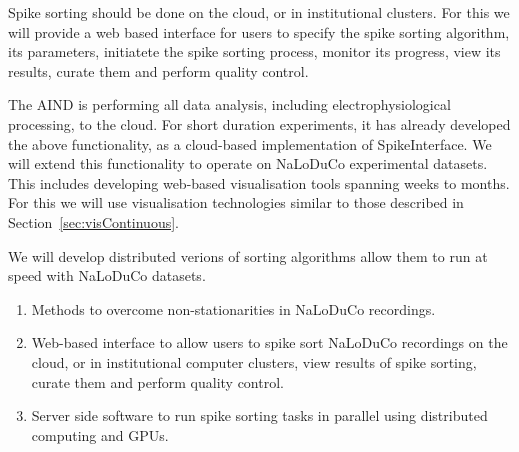 
Spike sorting should be done on the cloud, or in institutional clusters. For
this we will provide a web based interface for users to specify the spike
sorting algorithm, its parameters, initiatete the spike sorting process,
monitor its progress, view its results, curate them and perform quality
control.

The AIND is performing all data analysis, including electrophysiological
processing, to the cloud. For short duration experiments, it has already
developed the above functionality, as a cloud-based implementation of
SpikeInterface.
%
We will extend this functionality to operate on NaLoDuCo experimental datasets.
This includes developing web-based visualisation tools
spanning weeks to months. For this we will use visualisation technologies similar to those
described in Section~\ref{sec:visContinuous}.

We will develop distributed verions of sorting algorithms allow them to run at
speed with NaLoDuCo datasets.


\begin{enumerate}
    \item Methods to overcome non-stationarities in NaLoDuCo recordings.
    \item Web-based interface to allow users to spike sort NaLoDuCo recordings
        on the cloud, or in institutional computer clusters, view results of
        spike sorting, curate them and perform quality control.
    \item Server side software to run spike sorting tasks in parallel using
        distributed computing and GPUs.

\end{enumerate}


